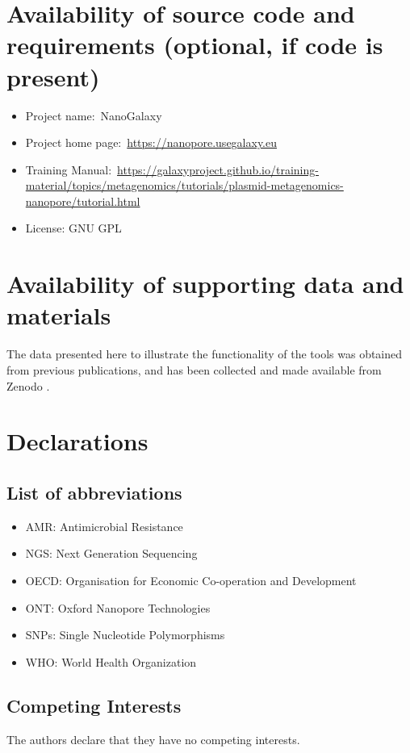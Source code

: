 \documentclass[a4paper,num-refs]{oup-contemporary}
\begin{document}
\section{Availability of source code and requirements (optional, if code is present)}

\begin{itemize}
\item Project name:~NanoGalaxy
\item Project home page:~\url{https://nanopore.usegalaxy.eu}
\item Training Manual:~\url{https://galaxyproject.github.io/training-material/topics/metagenomics/tutorials/plasmid-metagenomics-nanopore/tutorial.html}
\item License: GNU GPL
\end{itemize}

\section{Availability of supporting data and materials}

The data presented here to illustrate the functionality of the tools was obtained from previous publications, and has been collected and made available from Zenodo \cite{TODO}.

\section{Declarations}

\subsection{List of abbreviations}

\begin{itemize}
\item AMR: Antimicrobial Resistance
\item NGS: Next Generation Sequencing
\item OECD: Organisation for Economic Co-operation and Development
\item ONT: Oxford Nanopore Technologies
\item SNPs: Single Nucleotide Polymorphisms
\item WHO: World Health Organization
\end{itemize}

\subsection{Competing Interests}
The authors declare that they have no competing interests.
\end{document}
